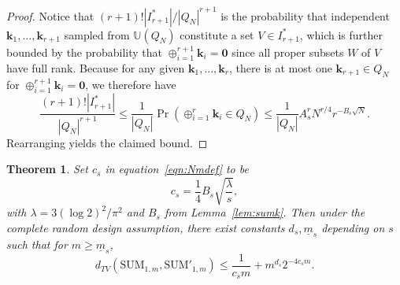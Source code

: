 \documentclass{article}
\newtheorem{theorem}{Theorem}
\theoremstyle{definition}
\renewcommand{\leq}{\leqslant}
\renewcommand{\geq}{\geqslant}
\newcommand{\bsk}{\boldsymbol{k}}
\newcommand{\bszero}{\boldsymbol{0}}
\newcommand{\dunif}{\mathbb{U}}
\begin{document}
\begin{proof}
    Notice that $(r+1)!|I^*_{r+1}|/|Q_{N}|^{r+1}$ is the probability that independent $\bsk_1,\dots,\bsk_{r+1}$ sampled from $\dunif( Q_{N})$ constitute a set $V\in I^*_{r+1}$, which is further bounded by the probability that $\oplus_{i=1}^{r+1}\bsk_i=\bszero$ since all proper subsets $W$ of $V$ have full rank. Because for any given $\bsk_1,...,\bsk_{r}$, there is at most one $\bsk_{r+1}\in Q_N$ for $\oplus_{i=1}^{r+1}\bsk_i=\bszero$, we therefore have
    $$\frac{(r+1)!|I^*_{r+1}|}{|Q_{N}|^{r+1}} \leq \frac{1}{|Q_N|}\Pr\left(\oplus_{i=1}^{r}\bsk_i\in Q_N\right)\leq \frac{1}{|Q_N|}A^r_s N^{r/4} r^{-B_s\sqrt{N}}.$$
    Rearranging yields the claimed bound.
\end{proof}

\begin{theorem}\label{thm:step1}
Set $c_s$ in equation~\eqref{eqn:Nmdef} to be
\begin{equation}\label{eqn:cs}
    c_s=\frac{1}{4}B_s\sqrt{\frac{\lambda}{s}},
\end{equation}
with $\lambda=3(\log 2)^2/\pi^2$ and $B_s$ from Lemma~\ref{lem:sumk}.  Then under the complete random design assumption, there exist constants $d_s,\underline{m}_s$ depending on $s$ such that for $m\geq \underline{m}_s$,
$$d_{TV}(\mathrm{SUM}_{1,m},\mathrm{SUM}'_{1,m})\leq \frac{1}{c_sm}+m^{d_s} 2^{-4c_sm}.$$
\end{theorem}
\end{document}
